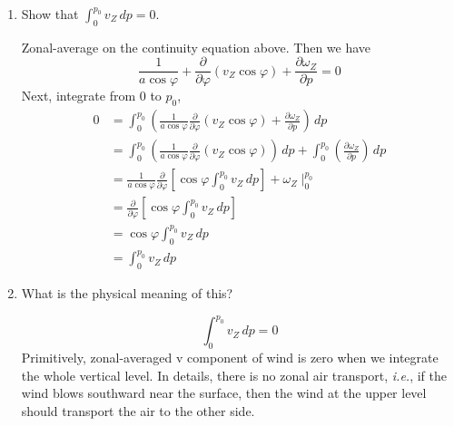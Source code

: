 \documentclass[11pt,a4paper]{article}
\begin{document}
\begin{enumerate}[label=(\alph*)]
    \item Show that $\int_0^{p_0} v_Z\,dp = 0$.
    \begin{solution}
    Zonal-average on the continuity equation above. Then we have 
    $$\frac{1}{a\cos\varphi}+\frac{\partial}{\partial \varphi}(v_Z\cos\varphi) + \frac{\partial \omega_Z}{\partial p} = 0$$
    Next, integrate from 0 to $p_0$,
    \begin{align*}
        0&= \int_0^{p_0}\left(\frac{1}{a\cos\varphi}\frac{\partial}{\partial \varphi}(v_Z\cos\varphi) + \frac{\partial \omega_Z}{\partial p} \right)\, dp\\
        &=\int_0^{p_0}\left(\frac{1}{a\cos\varphi}\frac{\partial}{\partial \varphi}(v_Z\cos\varphi)\right)\, dp + \int_0^{p_0}\left(\frac{\partial \omega_Z}{\partial p} \right)\, dp\\
        &= \frac{1}{a\cos\varphi}\frac{\partial}{\partial \varphi}\left[\cos \varphi\int_0^{p_0}v_Z\, dp\right] + \omega_Z \mid_0^{p_0}\\
        &= \frac{\partial}{\partial \varphi}\left[\cos \varphi\int_0^{p_0}v_Z\, dp\right]\\
        &= \cos \varphi\int_0^{p_0}v_Z\, dp\\
        &= \int_0^{p_0}v_Z\, dp
    \end{align*}
    \end{solution}
    \item What is the physical meaning of this?
    \begin{solution}
        $$\int_0^{p_0}v_Z\, dp = 0$$
        Primitively, zonal-averaged v component of wind is zero when we integrate the whole vertical level. In details, there is no zonal air transport, \textit{i.e.}, if the wind blows southward near the surface, then the wind at the upper level should transport the air to the other side. 
    \end{solution}

\end{enumerate}
\end{document}
